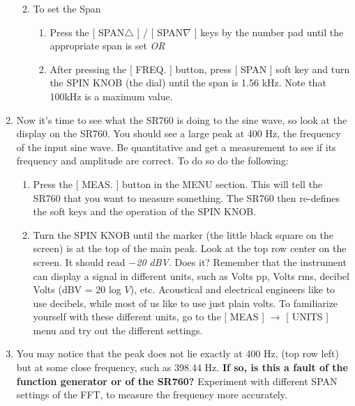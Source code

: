 \documentclass{../lab}
\begin{document}
\begin{enumerate}
\begin{enumerate}
\begin{enumerate}
        \end{enumerate}

        \item To set the Span
        \begin{enumerate}
            \item Press the [ SPAN$\triangle$ ] / [ SPAN$\nabla$ ] keys by the number pad until the appropriate span is set \emph{OR}

            \item After pressing the [ FREQ. ] button, press [ SPAN ] soft key and turn the SPIN KNOB (the dial) until the span is 1.56 kHz. Note that 100kHz is a maximum value.

        \end{enumerate}

    \end{enumerate}

    \item Now it's time to see what the SR760 is doing to the sine wave, so look at the display on the SR760. You should see a large peak at 400 Hz, the frequency of the input sine wave. Be quantitative and get a measurement to see if its frequency and amplitude are correct. To do so do the following:
    \begin{enumerate}
        \item Press the [ MEAS. ] button in the MENU section. This will tell the SR760 that you want to measure something. The SR760 then re-defines the soft keys and the operation of the SPIN KNOB.

        \item Turn the SPIN KNOB until the marker (the little black square on the screen) is at the top of the main peak. Look at the top row center on the screen. It should read \emph{$-$20 dBV}. Does it? Remember that the instrument can display a signal in different units, such as Volts pp, Volts rms, decibel Volts (dBV = 20 log $V$), etc. Acoustical and electrical engineers like to use decibels, while most of us like to use just plain volts. To familiarize yourself with these different units, go to the [ MEAS ] $\rightarrow$ [ UNITS ] menu and try out the different settings.

    \end{enumerate}

    \item You may notice that the peak does not lie exactly at 400 Hz, (top row left) but at some close frequency, such as 398.44 Hz. \textbf{If so, is this a fault of the function generator or of the SR760?} Experiment with different SPAN settings of the FFT, to measure the frequency more accurately.


\end{enumerate}
\end{document}
